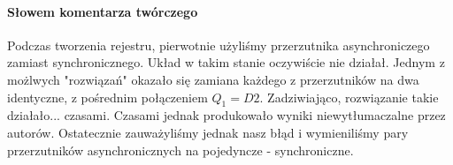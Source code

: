 \documentclass{article}
\begin{document}
\paragraph{Słowem komentarza twórczego}
Podczas tworzenia rejestru, pierwotnie użyliśmy przerzutnika asynchroniczego zamiast synchronicznego. Układ w takim stanie oczywiście nie działał. Jednym z możlwych "rozwiązań" okazało się zamiana każdego z przerzutników na dwa identyczne, z pośrednim połączeniem $Q_{1} = D{2}$. Zadziwiająco, rozwiązanie takie działało... czasami. Czasami jednak produkowało wyniki niewytłumaczalne przez autorów. Ostatecznie zauważyliśmy jednak nasz błąd i wymieniliśmy pary przerzutników asynchronicznych na pojedyncze - synchroniczne.
\end{document}
